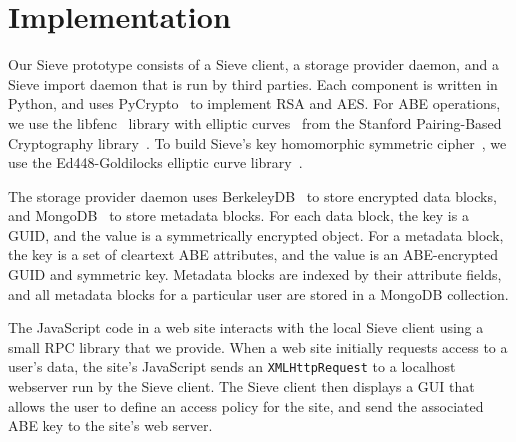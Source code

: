 \chapter{Implementation}
\label{sec:implementation}
Our Sieve prototype consists of a Sieve
client, a storage provider daemon, and a
Sieve import daemon that is run by third
parties. Each component is written in Python,
and uses PyCrypto~\cite{pyCrypto} to implement
RSA and AES. For ABE operations, we use the
libfenc~\cite{libfenc} library with elliptic
curves~\cite{mnt224} from the Stanford
Pairing-Based Cryptography library~\cite{pbc}.
To build Sieve's key homomorphic symmetric
cipher~\cite{keyhom}, we use the Ed448-Goldilocks
elliptic curve library~\cite{ed448}.

The storage provider daemon uses BerkeleyDB~\cite{berkdb}
to store encrypted data blocks, and MongoDB~\cite{mongodb}
to store metadata blocks. For each data block,
the key is a GUID, and the value is a symmetrically
encrypted object. For a metadata block, the
key is a set of cleartext ABE attributes, and
the value is an ABE-encrypted GUID and symmetric
key. Metadata blocks are indexed by their
attribute fields, and all metadata blocks for
a particular user are stored in a MongoDB
collection.

The JavaScript code in a web site interacts
with the local Sieve client using a small
RPC library that we provide. When a web site
initially requests access to a user's data,
the site's JavaScript sends an \texttt{XMLHttpRequest} 
to a localhost webserver run by the Sieve
client. The Sieve client then displays a
GUI that allows the user to define an
access policy for the site, and send the
associated ABE key to the site's web server.